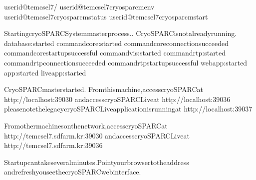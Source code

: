 \documentclass[a4paper,10pt,english]{sphinxmanual}
\begin{document}
\begin{sphinxVerbatim}[commandchars=\\\{\}]
userid@tem\PYGZhy{}cs\PYGZhy{}el7\PYGZdl{}\PYGZgt{}\PYGZti{}/
userid@tem\PYGZhy{}cs\PYGZhy{}el7\PYGZdl{}\PYGZgt{}cryosparcmenv
userid@tem\PYGZhy{}cs\PYGZhy{}el7\PYGZdl{}\PYGZgt{}cryosparcmstatus
userid@tem\PYGZhy{}cs\PYGZhy{}el7\PYGZdl{}\PYGZgt{}cryosparcmstart

StartingcryoSPARCSystemmasterprocess..
CryoSPARCisnotalreadyrunning.
database:started
command\PYGZus{}core:started
command\PYGZus{}coreconnectionsucceeded
command\PYGZus{}corestartupsuccessful
command\PYGZus{}vis:started
command\PYGZus{}rtp:started
command\PYGZus{}rtpconnectionsucceeded
command\PYGZus{}rtpstartupsuccessful
webapp:started
app:started
liveapp:started
\PYGZhy{}\PYGZhy{}\PYGZhy{}\PYGZhy{}\PYGZhy{}\PYGZhy{}\PYGZhy{}\PYGZhy{}\PYGZhy{}\PYGZhy{}\PYGZhy{}\PYGZhy{}\PYGZhy{}\PYGZhy{}\PYGZhy{}\PYGZhy{}\PYGZhy{}\PYGZhy{}\PYGZhy{}\PYGZhy{}\PYGZhy{}\PYGZhy{}\PYGZhy{}\PYGZhy{}\PYGZhy{}\PYGZhy{}\PYGZhy{}\PYGZhy{}\PYGZhy{}\PYGZhy{}\PYGZhy{}\PYGZhy{}\PYGZhy{}\PYGZhy{}\PYGZhy{}\PYGZhy{}\PYGZhy{}\PYGZhy{}\PYGZhy{}\PYGZhy{}\PYGZhy{}\PYGZhy{}\PYGZhy{}\PYGZhy{}\PYGZhy{}\PYGZhy{}\PYGZhy{}\PYGZhy{}\PYGZhy{}\PYGZhy{}\PYGZhy{}\PYGZhy{}\PYGZhy{}

CryoSPARCmasterstarted.
Fromthismachine,accesscryoSPARCat
http://localhost:39030
andaccesscryoSPARCLiveat
http://localhost:39036
pleasenotethelegacycryoSPARCLiveapplicationisrunningat
http://localhost:39037

Fromothermachinesonthenetwork,accesscryoSPARCat
http://tem\PYGZhy{}cs\PYGZhy{}el7.sdfarm.kr:39030
andaccesscryoSPARCLiveat
http://tem\PYGZhy{}cs\PYGZhy{}el7.sdfarm.kr:39036


Startupcantakeseveralminutes.Pointyourbrowsertotheaddress
andrefreshyouseethecryoSPARCwebinterface.
\end{sphinxVerbatim}
\end{document}

